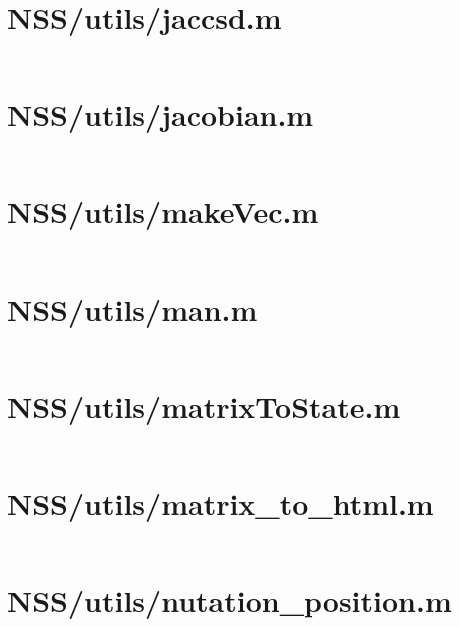 \pagebreak
\section*{NSS/utils/jaccsd.m}\label{code:NSS/utils/jaccsd.m}
\inputminted[linenos,fontsize=\scriptsize]{matlab}{/home/dcouture/git/mathyourlife/TSatPy/beta_versions/matlab_object_oriented/utils/jaccsd.m}

\pagebreak
\section*{NSS/utils/jacobian.m}\label{code:NSS/utils/jacobian.m}
\inputminted[linenos,fontsize=\scriptsize]{matlab}{/home/dcouture/git/mathyourlife/TSatPy/beta_versions/matlab_object_oriented/utils/jacobian.m}

\pagebreak
\section*{NSS/utils/makeVec.m}\label{code:NSS/utils/makeVec.m}
\inputminted[linenos,fontsize=\scriptsize]{matlab}{/home/dcouture/git/mathyourlife/TSatPy/beta_versions/matlab_object_oriented/utils/makeVec.m}

\pagebreak
\section*{NSS/utils/man.m}\label{code:NSS/utils/man.m}
\inputminted[linenos,fontsize=\scriptsize]{matlab}{/home/dcouture/git/mathyourlife/TSatPy/beta_versions/matlab_object_oriented/utils/man.m}

\pagebreak
\section*{NSS/utils/matrixToState.m}\label{code:NSS/utils/matrixToState.m}
\inputminted[linenos,fontsize=\scriptsize]{matlab}{/home/dcouture/git/mathyourlife/TSatPy/beta_versions/matlab_object_oriented/utils/matrixToState.m}

\pagebreak
\section*{NSS/utils/matrix\_to\_html.m}\label{code:NSS/utils/matrix_to_html.m}
\inputminted[linenos,fontsize=\scriptsize]{matlab}{/home/dcouture/git/mathyourlife/TSatPy/beta_versions/matlab_object_oriented/utils/matrix_to_html.m}

\pagebreak
\section*{NSS/utils/nutation\_position.m}\label{code:NSS/utils/nutation_position.m}
\inputminted[linenos,fontsize=\scriptsize]{matlab}{/home/dcouture/git/mathyourlife/TSatPy/beta_versions/matlab_object_oriented/utils/nutation_position.m}

